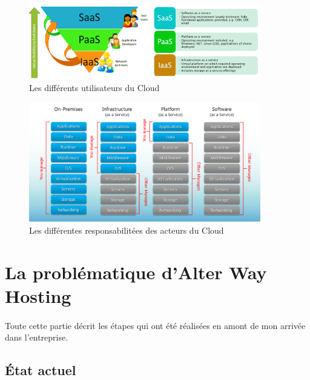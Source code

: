 \subsection*{} %

\begin{figure}[H]
\centering
\includegraphics[width=0.9\textwidth]{resource/img/clouds-users}
\caption{Les différents utilisateurs du Cloud}
\end{figure}

\begin{figure}[H]
\centering
\includegraphics[width=0.9\textwidth]{resource/img/clouds-responsabilities}
\caption{Les différentes responsabilitées des acteurs du Cloud}
\end{figure}

\section{La problématique d'Alter Way Hosting}

\paragraph*{}
Toute cette partie décrit les étapes qui ont été réalisées en amont de mon arrivée dans l'entreprise.

\subsection{État actuel}
